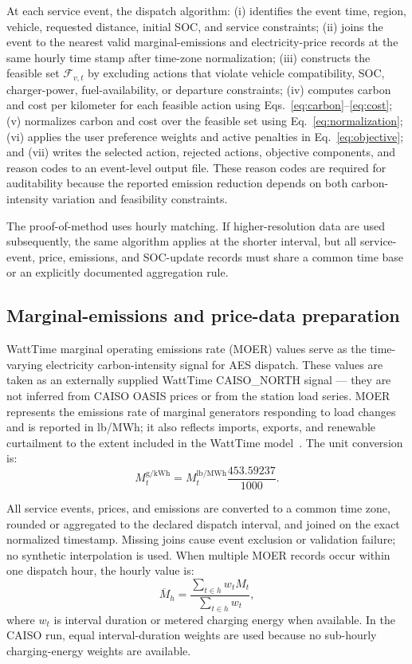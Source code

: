 \documentclass[cleantechnol,article,submit,pdftex,moreauthors]{Definitions/mdpi}
\begin{document}
At each service event, the dispatch algorithm: (i) identifies the event time, region, vehicle, requested distance, initial SOC, and service constraints; (ii) joins the event to the nearest valid marginal-emissions and electricity-price records at the same hourly time stamp after time-zone normalization; (iii) constructs the feasible set $\mathcal{F}_{v,t}$ by excluding actions that violate vehicle compatibility, SOC, charger-power, fuel-availability, or departure constraints; (iv) computes carbon and cost per kilometer for each feasible action using Eqs.~\eqref{eq:carbon}--\eqref{eq:cost}; (v) normalizes carbon and cost over the feasible set using Eq.~\eqref{eq:normalization}; (vi) applies the user preference weights and active penalties in Eq.~\eqref{eq:objective}; and (vii) writes the selected action, rejected actions, objective components, and reason codes to an event-level output file. These reason codes are required for auditability because the reported emission reduction depends on both carbon-intensity variation and feasibility constraints.

The proof-of-method uses hourly matching. If higher-resolution data are used subsequently, the same algorithm applies at the shorter interval, but all service-event, price, emissions, and SOC-update records must share a common time base or an explicitly documented aggregation rule.


\subsection{Marginal-emissions and price-data preparation}
\label{subsec:marginal_emissions}

WattTime marginal operating emissions rate (MOER) values serve as the time-varying electricity carbon-intensity signal for AES dispatch. These values are taken as an externally supplied WattTime CAISO\_NORTH signal --- they are not inferred from CAISO OASIS prices or from the station load series. MOER represents the emissions rate of marginal generators responding to load changes and is reported in lb/MWh; it also reflects imports, exports, and renewable curtailment to the extent included in the WattTime model~\cite{WattTimeAPI}. The unit conversion is:
\begin{equation}
	M_{t}^{\mathrm{g/kWh}} = M_{t}^{\mathrm{lb/MWh}}\frac{453.59237}{1000}.
	\label{eq:moer_conversion}
\end{equation}

All service events, prices, and emissions are converted to a common time zone, rounded or aggregated to the declared dispatch interval, and joined on the exact normalized timestamp. Missing joins cause event exclusion or validation failure; no synthetic interpolation is used. When multiple MOER records occur within one dispatch hour, the hourly value is:
\begin{equation}
	\overline{M}_{h}=\frac{\sum_{t\in h}w_t M_t}{\sum_{t\in h}w_t},
	\label{eq:moer_aggregation}
\end{equation}
where $w_t$ is interval duration or metered charging energy when available. In the CAISO run, equal interval-duration weights are used because no sub-hourly charging-energy weights are available.
\end{document}

